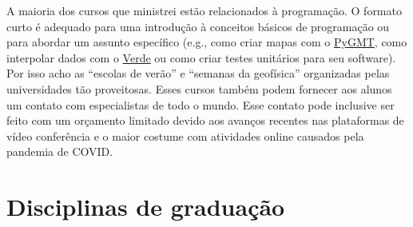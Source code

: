 \documentclass[10pt,a4paper,oneside]{book}
\begin{document}
A maioria dos cursos que ministrei estão relacionados à programação. O formato
curto é adequado para uma introdução à conceitos básicos de programação ou
para abordar um assunto específico (e.g., como criar mapas com o
\href{https://www.pygmt.org}{PyGMT},
como interpolar dados com o \href{https://www.fatiando.org/verde}{Verde}
ou como criar testes unitários para seu software).
Por isso acho as ``escolas de verão'' e ``semanas da geofísica'' organizadas
pelas universidades tão proveitosas.
Esses cursos também podem fornecer aos alunos um contato com especialistas de
todo o mundo.
Esse contato pode inclusive ser feito com um orçamento limitado
devido aos avanços recentes nas plataformas de vídeo conferência e o maior
costume com atividades online causados pela pandemia de COVID.


\section{Disciplinas de graduação}
\label{sec_ensino_grad}
\end{document}
